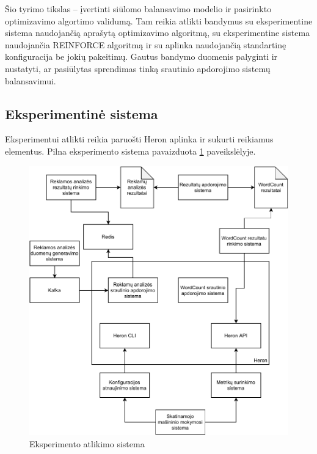 \documentclass{VUMIFPSbakalaurinis}
\begin{document}
Šio tyrimo tikslas – įvertinti siūlomo balansavimo modelio ir pasirinkto optimizavimo algortimo validumą. Tam reikia atlikti bandymus su eksperimentine sistema naudojančią aprašytą optimizavimo algoritmą, su eksperimentine sistema naudojančia REINFORCE algoritmą ir su aplinka naudojančią standartinę konfiguracija be jokių pakeitimų. Gautus bandymo duomenis palyginti ir nustatyti, ar pasiūlytas sprendimas tinką srautinio apdorojimo sistemų balansavimui.

\subsection{Eksperimentinė sistema}

Eksperimentui atlikti reikia paruošti Heron aplinka ir sukurti reikiamus elementus. Pilna eksperimento sistema pavaizduota \ref{experiment} paveikslėlyje.

\begin{figure}[H]
    \includegraphics[width=14cm]{img/Experiment.pdf}
    \caption{Eksperimento atlikimo sistema}
    \label{experiment}
\end{figure} 
\end{document}
